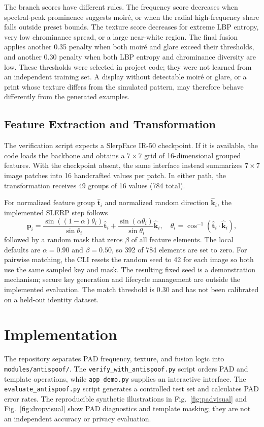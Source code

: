 \documentclass[conference,10pt]{IEEEtran}
\begin{document}
The branch scores have different rules. The frequency score decreases when spectral-peak prominence suggests moir\'e, or when the radial high-frequency share falls outside preset bounds. The texture score decreases for extreme LBP entropy, very low chrominance spread, or a large near-white region. The final fusion applies another 0.35 penalty when both moir\'e and glare exceed their thresholds, and another 0.30 penalty when both LBP entropy and chrominance diversity are low. These thresholds were selected in project code; they were not learned from an independent training set. A display without detectable moir\'e or glare, or a print whose texture differs from the simulated pattern, may therefore behave differently from the generated examples.

\subsection{Feature Extraction and Transformation}
The verification script expects a SlerpFace IR-50 checkpoint. If it is available, the code loads the backbone and obtains a $7\times7$ grid of 16-dimensional grouped features. With the checkpoint absent, the same interface instead summarizes $7\times7$ image patches into 16 handcrafted values per patch. In either path, the transformation receives 49 groups of 16 values (784 total).

For normalized feature group $\hat{\boldsymbol t}_i$ and normalized random direction $\hat{\boldsymbol k}_i$, the implemented SLERP step follows
\begin{equation}
\boldsymbol p_i=
\frac{\sin((1-\alpha)\theta_i)}{\sin\theta_i}\hat{\boldsymbol t}_i+
\frac{\sin(\alpha\theta_i)}{\sin\theta_i}\hat{\boldsymbol k}_i,
\quad
\theta_i=\cos^{-1}(\hat{\boldsymbol t}_i\cdot\hat{\boldsymbol k}_i),
\label{eq:slerp}
\end{equation}
followed by a random mask that zeros $\beta$ of all feature elements. The local defaults are $\alpha=0.90$ and $\beta=0.50$, so 392 of 784 elements are set to zero. For pairwise matching, the CLI resets the random seed to 42 for each image so both use the same sampled key and mask. The resulting fixed seed is a demonstration mechanism; secure key generation and lifecycle management are outside the implemented evaluation. The match threshold is 0.30 and has not been calibrated on a held-out identity dataset.

\section{Implementation}
The repository separates PAD frequency, texture, and fusion logic into \texttt{modules/antispoof/}. The \texttt{verify\_with\_antispoof.py} script orders PAD and template operations, while \texttt{app\_demo.py} supplies an interactive interface. The \texttt{evaluate\_antispoof.py} script generates a controlled test set and calculates PAD error rates. The reproducible synthetic illustrations in Fig.~\ref{fig:padvisual} and Fig.~\ref{fig:dropvisual} show PAD diagnostics and template masking; they are not an independent accuracy or privacy evaluation.
\end{document}
